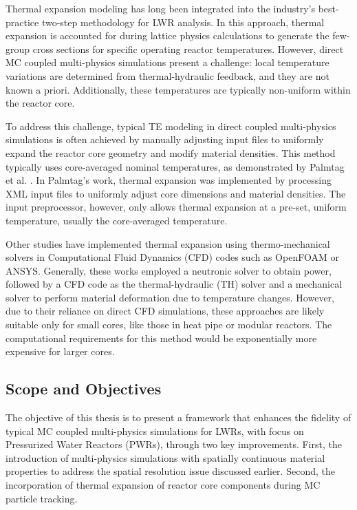 Thermal expansion modeling has long been integrated into the industry's best-practice two-step methodology for LWR analysis. In this approach, thermal expansion is accounted for during lattice physics calculations to generate the few-group cross sections for specific operating reactor temperatures. However, direct MC coupled multi-physics simulations present a challenge: local temperature variations are determined from thermal-hydraulic feedback, and they are not known a priori. Additionally, these temperatures are typically non-uniform within the reactor core.

To address this challenge, typical TE modeling in direct coupled multi-physics simulations is often achieved by manually adjusting input files to uniformly expand the reactor core geometry and modify material densities. This method typically uses core-averaged nominal temperatures, as demonstrated by Palmtag et al. \cite{palmtag}. In Palmtag's work, thermal expansion was implemented by processing XML input files to uniformly adjust core dimensions and material densities. The input preprocessor, however, only allows thermal expansion at a pre-set, uniform temperature, usually the core-averaged temperature.

Other studies \cite{fiorina,ma_2021,guo} have implemented thermal expansion using thermo-mechanical solvers in Computational Fluid Dynamics (CFD) codes such as OpenFOAM or ANSYS. Generally, these works employed a neutronic solver to obtain power, followed by a CFD code as the thermal-hydraulic (TH) solver and a mechanical solver to perform material deformation due to temperature changes. However, due to their reliance on direct CFD simulations, these approaches are likely suitable only for small cores, like those in heat pipe or modular reactors. The computational requirements for this method would be exponentially more expensive for larger cores.

\subsection{Scope and Objectives}

The objective of this thesis is to present a framework that enhances the fidelity of typical MC coupled multi-physics simulations for LWRs, with focus on Pressurized Water Reactors (PWRs), through two key improvements. First, the introduction of multi-physics simulations with spatially continuous material properties \cite{imron_2024} to address the spatial resolution issue discussed earlier. Second, the incorporation of thermal expansion of reactor core components during MC particle tracking.

